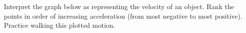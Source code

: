 \label{fnt8.2.1-4}

Interpret the graph below as representing the velocity of an object. Rank the points in order of increasing acceleration (from most negative to most positive). Practice walking this plotted motion.


\def\FunctionF(#1){0.02*(#1)^5-0.007*(#1)^4-0.051*(#1)^3-0.49*(#1)^2+0.235+1/(((#1)-2.55)^2+0.52)}%

